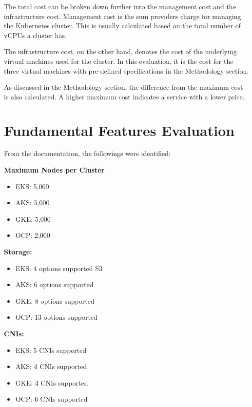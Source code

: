 \FloatBarrier

The total cost can be broken down further into the management cost and the infrastructure cost. Management cost is the sum providers charge for managing the Kubernetes cluster. This is usually calculated based on the total number of vCPUs a cluster has.

The infrastructure cost, on the other hand, denotes the cost of the underlying virtual machines used for the cluster. In this evaluation, it is the cost for the three virtual machines with pre-defined specifications in the Methodology section.

As discussed in the Methodology section, the difference from the maximum cost is also calculated. A higher maximum cost indicates a service with a lower price.

\section{Fundamental Features Evaluation}

From the documentation, the followings were identified:

\textbf{Maximum Nodes per Cluster}

\begin{itemize}
\tightlist
\item
  EKS: 5,000 \cite{KnownLimitsService}
\item
  AKS: 5,000  \cite{nickomangLimitsResourcesSKUs2024}
\item
  GKE: 5,000 \cite{QuotasLimitsGoogle}
\item
  OCP: 2,000  \cite{Chapter4Planning}
\end{itemize}



\textbf{Storage:}

\begin{itemize}
\tightlist
\item
  EKS: 4 options supported
  S3 \cite{StoreApplicationData}
\item
     AKS: 6 options supported \cite{tamramConceptsStorageAzure2024}
\item
  GKE: 8 options supported \cite{StorageGKEClusters} 
\item
  OCP: 13 options supported \cite{UnderstandingPersistentStorage} 
\end{itemize}

\textbf{CNIs:}

\begin{itemize}
\tightlist
\item
  EKS: 5 CNIs supported \cite{AlternateCNIPlugins}
\item
  AKS: 4 CNIs supported \cite{schaffererinConceptsCNINetworking2024}
\item
  GKE: 4 CNIs supported \cite{NetworkOverviewGooglea}
\item
  OCP: 6 CNIs supported \cite{CertifiedOpenShiftCNI2024}
\end{itemize}

